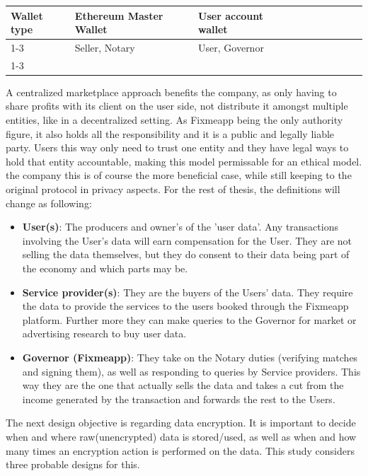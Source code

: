 \documentclass[a4paper,11pt]{report} %
\theoremstyle{change}
\theoremstyle{theoremstyle}
\begin{document}
\begin{table}[h!]
\begin{tabular}{llllllllll}
\multicolumn{1}{|l|}{\cellcolor[HTML]{C0C0C0}Wallet type} & \multicolumn{1}{l|}{\cellcolor[HTML]{C0C0C0}Ethereum Master Wallet} & \multicolumn{1}{l|}{\cellcolor[HTML]{C0C0C0}User account wallet} &  &  &  &  &  &  &  \\ \cline{1-3}
\multicolumn{1}{|l|}{\cellcolor[HTML]{C0C0C0}Entities receiving compensation} & \multicolumn{1}{l|}{\cellcolor[HTML]{C0C0C0}Seller, Notary} & \multicolumn{1}{l|}{\cellcolor[HTML]{C0C0C0}User, Governor} &  &  &  &  &  &  &  \\ \cline{1-3}
\end{tabular}
\end{table}

A centralized marketplace approach benefits the company, as only having to share profits with its client on the user side, not distribute it amongst multiple entities, like in a decentralized setting. As Fixmeapp being the only authority figure, it also holds all the responsibility and it is a public and legally liable party. Users this way only need to trust one entity and they have legal ways to hold that entity accountable, making this model permissable for an ethical model.\\
 the company this is of course the more beneficial case, while still keeping to the original protocol in privacy aspects. For the rest of thesis, the definitions will change as following:
\begin{itemize}
    \item \textbf{User(s)}: The producers and owner's of the 'user data'. Any transactions involving the User's data will earn compensation for the User. They are not selling the data themselves, but they do consent to their data being part of the economy and which parts may be.
    \item \textbf{Service provider(s)}: They are the buyers of the Users' data. They require the data to provide the services to the users booked through the Fixmeapp platform. Further more they can make queries to the Governor for market or advertising research to buy user data.
    \item \textbf{Governor (Fixmeapp)}: They take on the Notary duties (verifying matches and signing them), as well as responding to queries by Service providers. This way they are the one that actually sells the data and takes a cut from the income generated by the transaction and forwards the rest to the Users.
\end{itemize}
The next design objective is regarding data encryption. It is important to decide when and where raw(unencrypted) data is stored/used, as well as when and how many times an encryption action is performed on the data. This study considers three probable designs for this.\\
\end{document}
